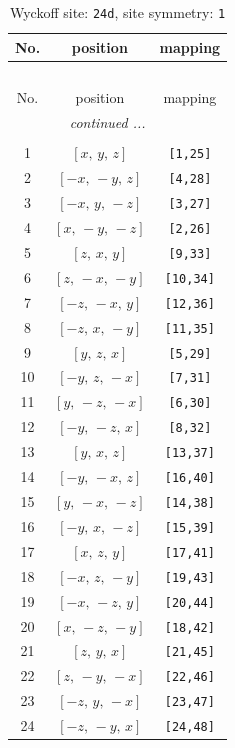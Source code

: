 \documentclass[fleqn,8pt]{jsarticle}
\begin{document}
\begin{longtable}{ccc}
\caption{Wyckoff site: {\tt 24d}, site symmetry: {\tt 1}}
 \\
 \hline \hline
No. & position & mapping \\ \hline \endfirsthead

\multicolumn{2}{l}{\tablename\ \thetable{}} \\
 \hline \hline
No. & position & mapping \\ \hline \endhead

 \hline \hline
\multicolumn{2}{r}{\footnotesize\it continued ...} \\ \endfoot

 \hline \hline
\multicolumn{2}{r}{} \\ \endlastfoot

1 & $\left[ x,\, y,\, z \right]$ & {\tt [1,25]} \\ \hline
2 & $\left[ - x,\, - y,\, z \right]$ & {\tt [4,28]} \\ \hline
3 & $\left[ - x,\, y,\, - z \right]$ & {\tt [3,27]} \\ \hline
4 & $\left[ x,\, - y,\, - z \right]$ & {\tt [2,26]} \\ \hline
5 & $\left[ z,\, x,\, y \right]$ & {\tt [9,33]} \\ \hline
6 & $\left[ z,\, - x,\, - y \right]$ & {\tt [10,34]} \\ \hline
7 & $\left[ - z,\, - x,\, y \right]$ & {\tt [12,36]} \\ \hline
8 & $\left[ - z,\, x,\, - y \right]$ & {\tt [11,35]} \\ \hline
9 & $\left[ y,\, z,\, x \right]$ & {\tt [5,29]} \\ \hline
10 & $\left[ - y,\, z,\, - x \right]$ & {\tt [7,31]} \\ \hline
11 & $\left[ y,\, - z,\, - x \right]$ & {\tt [6,30]} \\ \hline
12 & $\left[ - y,\, - z,\, x \right]$ & {\tt [8,32]} \\ \hline
13 & $\left[ y,\, x,\, z \right]$ & {\tt [13,37]} \\ \hline
14 & $\left[ - y,\, - x,\, z \right]$ & {\tt [16,40]} \\ \hline
15 & $\left[ y,\, - x,\, - z \right]$ & {\tt [14,38]} \\ \hline
16 & $\left[ - y,\, x,\, - z \right]$ & {\tt [15,39]} \\ \hline
17 & $\left[ x,\, z,\, y \right]$ & {\tt [17,41]} \\ \hline
18 & $\left[ - x,\, z,\, - y \right]$ & {\tt [19,43]} \\ \hline
19 & $\left[ - x,\, - z,\, y \right]$ & {\tt [20,44]} \\ \hline
20 & $\left[ x,\, - z,\, - y \right]$ & {\tt [18,42]} \\ \hline
21 & $\left[ z,\, y,\, x \right]$ & {\tt [21,45]} \\ \hline
22 & $\left[ z,\, - y,\, - x \right]$ & {\tt [22,46]} \\ \hline
23 & $\left[ - z,\, y,\, - x \right]$ & {\tt [23,47]} \\ \hline
24 & $\left[ - z,\, - y,\, x \right]$ & {\tt [24,48]} \\
\end{longtable}
\end{document}
